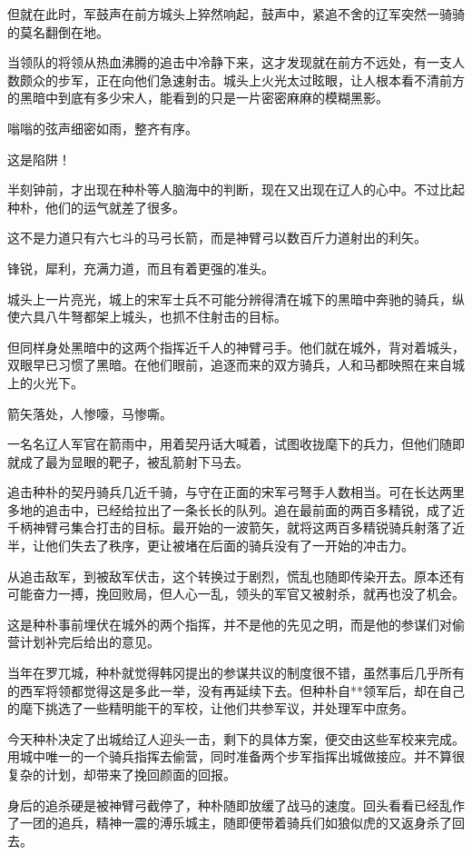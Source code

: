 但就在此时，军鼓声在前方城头上猝然响起，鼓声中，紧追不舍的辽军突然一骑骑的莫名翻倒在地。

当领队的将领从热血沸腾的追击中冷静下来，这才发现就在前方不远处，有一支人数颇众的步军，正在向他们急速射击。城头上火光太过眩眼，让人根本看不清前方的黑暗中到底有多少宋人，能看到的只是一片密密麻麻的模糊黑影。

嗡嗡的弦声细密如雨，整齐有序。

这是陷阱！

半刻钟前，才出现在种朴等人脑海中的判断，现在又出现在辽人的心中。不过比起种朴，他们的运气就差了很多。

这不是力道只有六七斗的马弓长箭，而是神臂弓以数百斤力道射出的利矢。

锋锐，犀利，充满力道，而且有着更强的准头。

城头上一片亮光，城上的宋军士兵不可能分辨得清在城下的黑暗中奔驰的骑兵，纵使六具八牛弩都架上城头，也抓不住射击的目标。

但同样身处黑暗中的这两个指挥近千人的神臂弓手。他们就在城外，背对着城头，双眼早已习惯了黑暗。在他们眼前，追逐而来的双方骑兵，人和马都映照在来自城上的火光下。

箭矢落处，人惨嚎，马惨嘶。

一名名辽人军官在箭雨中，用着契丹话大喊着，试图收拢麾下的兵力，但他们随即就成了最为显眼的靶子，被乱箭射下马去。

追击种朴的契丹骑兵几近千骑，与守在正面的宋军弓弩手人数相当。可在长达两里多地的追击中，已经给拉出了一条长长的队列。追在最前面的两百多精锐，成了近千柄神臂弓集合打击的目标。最开始的一波箭矢，就将这两百多精锐骑兵射落了近半，让他们失去了秩序，更让被堵在后面的骑兵没有了一开始的冲击力。

从追击敌军，到被敌军伏击，这个转换过于剧烈，慌乱也随即传染开去。原本还有可能奋力一搏，挽回败局，但人心一乱，领头的军官又被射杀，就再也没了机会。

这是种朴事前埋伏在城外的两个指挥，并不是他的先见之明，而是他的参谋们对偷营计划补完后给出的意见。

当年在罗兀城，种朴就觉得韩冈提出的参谋共议的制度很不错，虽然事后几乎所有的西军将领都觉得这是多此一举，没有再延续下去。但种朴自**领军后，却在自己的麾下挑选了一些精明能干的军校，让他们共参军议，并处理军中庶务。

今天种朴决定了出城给辽人迎头一击，剩下的具体方案，便交由这些军校来完成。用城中唯一的一个骑兵指挥去偷营，同时准备两个步军指挥出城做接应。并不算很复杂的计划，却带来了挽回颜面的回报。

身后的追杀硬是被神臂弓截停了，种朴随即放缓了战马的速度。回头看看已经乱作了一团的追兵，精神一震的溥乐城主，随即便带着骑兵们如狼似虎的又返身杀了回去。

